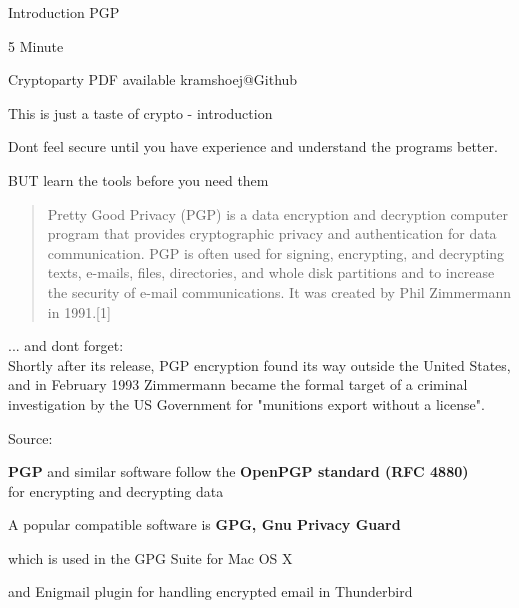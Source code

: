 \documentclass[20pt,landscape,a4paper,footrule]{foils}
\begin{document}


\mytitlepage
{Introduction PGP

5 Minute}

\centerline{\footnotesize Cryptoparty
 PDF available kramshoej@Github}

\LogoOn

%



\begin{center}
This is just a taste of crypto - introduction

Dont feel secure until you have experience and understand the programs better.

BUT learn the tools before you need them
\end{center}



\begin{quote}
Pretty Good Privacy (PGP) is a data encryption and decryption computer program that provides cryptographic privacy and authentication for data communication. PGP is often used for signing, encrypting, and decrypting texts, e-mails, files, directories, and whole disk partitions and to increase the security of e-mail communications. It was created by Phil Zimmermann in 1991.[1]
\end{quote}


... and dont forget:\\
Shortly after its release, PGP encryption found its way outside the United States, and in February 1993 Zimmermann became the formal target of a criminal investigation by the US Government for "munitions export without a license".

Source: 



\begin{list1}
\item {\bf PGP} and similar software follow the {\bf OpenPGP standard (RFC 4880)}\\
for encrypting and decrypting data
\item A popular compatible software is {\bf GPG, Gnu Privacy Guard}\\
\item which is used in the GPG Suite for Mac OS X 
\item and Enigmail plugin for handling encrypted email in Thunderbird
\end{list1}
\end{document}
